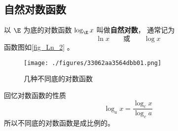 
\begin{issues}
\issueDraft
\end{issues}

\subsection{自然对数函数}
以 $\E$ 为底的对数函数 $\log_{\E} x$ 叫做\textbf{自然对数}， 通常记为
\begin{equation}
\ln x \qquad \text{或} \qquad \log x
\end{equation}
函数图如\autoref{fig_Ln_2} 。
\begin{figure}[ht]
\centering
\texttt{[image: ./figures/33062aa3564dbb01.png]}
\caption{几种不同底的对数函数} \label{fig_Ln_2}
\end{figure}
回忆对数函数的性质
\begin{equation}
\log_a x = \frac{\log_c x}{\log_c a}
\end{equation}
所以不同底的对数函数是成比例的。